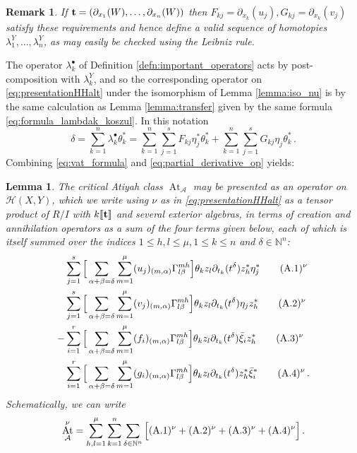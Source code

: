 \documentclass[english,letter paper,12pt,leqno]{article}
\newtheorem{lemma}[theorem]{Lemma}
\theoremstyle{example}
\newtheorem{remark}[theorem]{Remark}
\numberwithin{equation}{section}
\def\AA{\mathcal{A}}
\def\HH{\HH}
\def\HH{\mathcal{H}}
\def\be{\begin{equation}}
\def\ee{\end{equation}}
\DeclareMathOperator{\vAt}{At}
\begin{document}
\begin{remark}\label{remark:default_homotopies}
If $\bold{t} = (\partial_{x_1}(W), \ldots, \partial_{x_n}(W))$ then $F_{kj} = \partial_{x_k}(u_j), G_{kj} = \partial_{x_k}(v_j)$ satisfy these requirements and hence define a valid sequence of homotopies $\lambda^Y_1,\ldots,\lambda^Y_n$, as may easily be checked using the Leibniz rule.
\end{remark}

The operator $\lambda_k^\bullet$ of Definition \ref{defn:important_operators} acts by post-composition with $\lambda^Y_k$, and so the corresponding operator on \eqref{eq:presentationHHalt} under the isomorphism of Lemma \ref{lemma:iso_nu} is by the same calculation as Lemma \ref{lemma:transfer} given by the same formula \eqref{eq:formula_lambdak_koszul}. In this notation
\be\label{eq:delta_formula}
\delta = \sum_{k=1}^n \lambda^\bullet_k \theta_k^* = \sum_{k=1}^n \sum_{j=1}^s F_{kj} \eta_j^* \theta_k^* + \sum_{k=1}^n \sum_{j=1}^s G_{kj} \eta_j \theta_k^*\,.
\ee
Combining \eqref{eq:vat_formula} and \eqref{eq:partial_derivative_op} yields:

\begin{lemma}
The critical Atiyah class $\vAt_{\AA}$ may be presented as an operator on $\HH(X,Y)$, which we write using $\nu$ as in \eqref{eq:presentationHHalt} as a tensor product of $R/I$ with $k\llbracket \bold{t} \rrbracket$ and several exterior algebras, in terms of creation and annihilation operators as a sum of the four terms given below, each of which is itself summed over the indices $1 \le h,l \le \mu, 1 \le k \le n$ and $\delta \in \mathbb{N}^n$:
\begin{align}
& \sum_{j=1}^s \Big[ \sum_{\alpha + \beta = \delta } \sum_{m=1}^\mu (u_j)_{(m,\alpha)} \Gamma^{m h}_{l \beta} \Big] \theta_k z_{l} \partial_{t_k}(t^\delta) z_h^* \eta_j^*  \qquad (\textup{A}.1)^{\nu} \label{eq:a1vertex}\\
& \sum_{j=1}^s \Big[ \sum_{\alpha + \beta = \delta } \sum_{m=1}^\mu (v_j)_{(m,\alpha)} \Gamma^{mh}_{l\beta} \Big] \theta_k z_l \partial_{t_k}(t^\delta) \eta_j z_h^*  \qquad (\textup{A}.2)^{\nu} \label{eq:a2vertex}\\
-&\sum_{i=1}^r \Big[ \sum_{\alpha + \beta = \delta } \sum_{m=1}^\mu (f_i)_{(m,\alpha)} \Gamma^{mh}_{l\beta} \Big] \theta_k z_l \partial_{t_k}(t^\delta) \Bar{\xi}_i z_h^*  \qquad (\textup{A}.3)^{\nu} \label{eq:a3vertex}\\
&\sum_{i=1}^r \Big[ \sum_{\alpha + \beta = \delta } \sum_{m=1}^\mu (g_i)_{(m,\alpha)} \Gamma^{mh}_{l\beta} \Big] \theta_k z_l \partial_{t_k}(t^\delta) z_h^* \Bar{\xi}_i^* \qquad (\textup{A}.4)^{\nu}\,. \label{eq:a4vertex}
\end{align}
Schematically, we can write
\be
\vAt^\nu_{\AA} = \sum_{h,l=1}^\mu \sum_{k=1}^n\sum_{\delta \in \mathbb{N}^n} \Big[ (\textup{A}.1)^{\nu} + (\textup{A}.2)^{\nu} + (\textup{A}.3)^{\nu} + (\textup{A}.4)^{\nu} \Big]\,.
\ee
\end{lemma}
\end{document}

